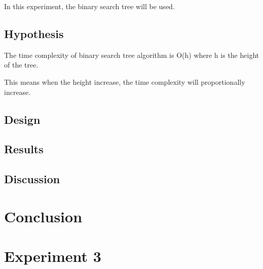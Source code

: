 \documentclass[a4]{article}
\begin{document}
In this experiment, the binary search tree will be used.

\subsection{Hypothesis}

The time complexity of binary search tree algorithm is O(h) where h is the height of the tree.

This means when the height increase, the time complexity will proportionally increase.

\subsection{Design}

\subsection{Results}

\subsection{Discussion}

\section{Conclusion}

\section{Experiment 3}

\appendix

\end{document}
